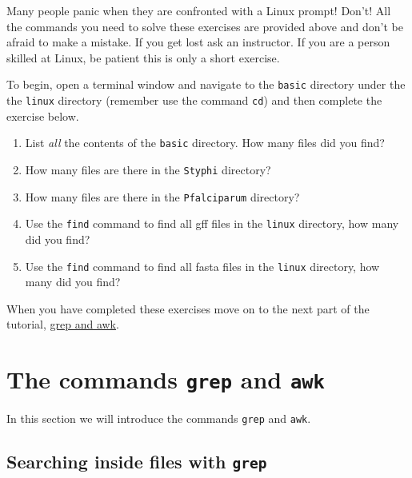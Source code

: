 \documentclass[11pt]{article}
\providecommand{\tightlist}{%
      \setlength{\itemsep}{0pt}\setlength{\parskip}{0pt}}
\begin{document}
Many people panic when they are confronted with a Linux prompt! Don't!
All the commands you need to solve these exercises are provided above
and don't be afraid to make a mistake. If you get lost ask an
instructor. If you are a person skilled at Linux, be patient this is
only a short exercise.

To begin, open a terminal window and navigate to the \texttt{basic}
directory under the the \texttt{linux} directory (remember use the
command \texttt{cd}) and then complete the exercise below.

\begin{enumerate}
\def\labelenumi{\arabic{enumi}.}
\tightlist
\item
  List \textit{all} the contents of the \texttt{basic} directory. How many
  files did you find?
\item
  How many files are there in the \texttt{Styphi} directory?
\item
  How many files are there in the \texttt{Pfalciparum} directory?
\item
  Use the \texttt{find} command to find all gff files in the
  \texttt{linux} directory, how many did you find?
\item
  Use the \texttt{find} command to find all fasta files in the
  \texttt{linux} directory, how many did you find?
\end{enumerate}

    When you have completed these exercises move on to the next part of the
tutorial, \href{grep_and_awk.ipynb}{grep and awk}.





\newpage





    \hypertarget{the-commands-grep-and-awk}{%
\section{\texorpdfstring{The commands \texttt{grep} and
\texttt{awk}}{The commands grep and awk}}\label{the-commands-grep-and-awk}}

In this section we will introduce the commands \texttt{grep} and
\texttt{awk}.

    \hypertarget{searching-inside-files-with-grep}{%
\subsection{\texorpdfstring{Searching inside files with
\texttt{grep}}{Searching inside files with grep}}\label{searching-inside-files-with-grep}}
\end{document}
